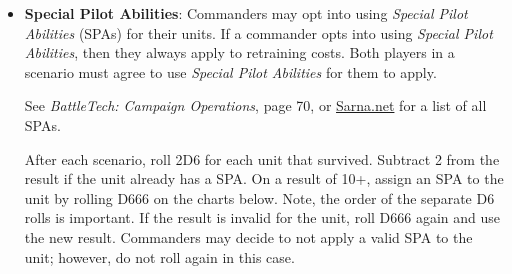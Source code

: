 \documentclass{article}
\begin{document}
\begin{itemize}
\begin{multicols}{2}
\begin{itemize}
\item \emph{Poor Targeting} (2 points)

\item \emph{Poor Workmanship} (1 point)

\item \emph{Ramshackle} (3 points)

\item \emph{Sensor Ghosts} (3 points)\\

\end{itemize}

\end{multicols}

\item {\bf Special Pilot Abilities}: Commanders may opt into using \emph{Special Pilot Abilities} (SPAs) for their units.
If a commander opts into using \emph{Special Pilot Abilities}, then they always apply to retraining costs.
Both players in a scenario must agree to use \emph{Special Pilot Abilities} for them to apply.

See \emph{BattleTech: Campaign Operations}, page 70, or \href{https://sarna.net}{Sarna.net} for a list of all SPAs.

After each scenario, roll 2D6 for each unit that survived.
Subtract 2 from the result if the unit already has a SPA.
On a result of 10+, assign an SPA to the unit by rolling D666 on the charts below.
Note, the order of the separate D6 rolls is important.
If the result is invalid for the unit, roll D666 again and use the new result.
Commanders may decide to not apply a valid SPA to the unit; however, do not roll again in this case.


\end{itemize}
\end{document}
